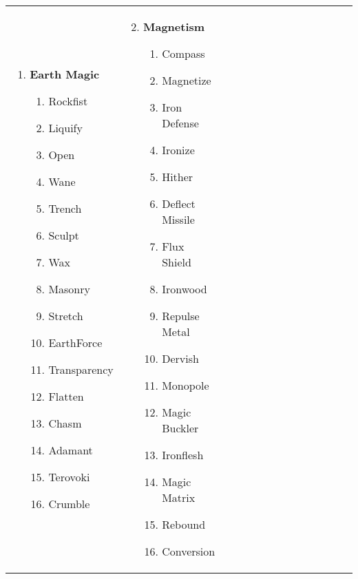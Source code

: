 \renewcommand{\labelenumii}{\arabic{enumii}.}
\begin{tabular}{@{} p{0.25\linewidth} p{0.25\linewidth} p{0.25\linewidth} p{0.25\linewidth}}
\begin{enumerate}
	\item \textbf{Earth Magic}
	\begin{enumerate}
		\item Rockfist
		\item Liquify
		\item Open
		\item Wane
		\item Trench
		\item Sculpt
		\item Wax
		\item Masonry
		\item Stretch
		\item EarthForce
		\item Transparency
		\item Flatten
		\item Chasm
		\item Adamant
		\item Terovoki
		\item Crumble
	\end{enumerate}
\end{enumerate} &
\begin{enumerate}
	\setcounter{enumi}{1}
	\item \textbf{Magnetism}
	\begin{enumerate}
		\item Compass
		\item Magnetize
		\item Iron Defense
		\item Ironize
		\item Hither
		\item Deflect Missile
		\item Flux Shield
		\item Ironwood
		\item Repulse Metal
		\item Dervish
		\item Monopole
		\item Magic Buckler
		\item Ironflesh
		\item Magic Matrix
		\item Rebound
		\item Conversion
	\end{enumerate}
\end{enumerate} &

\end{tabular}
